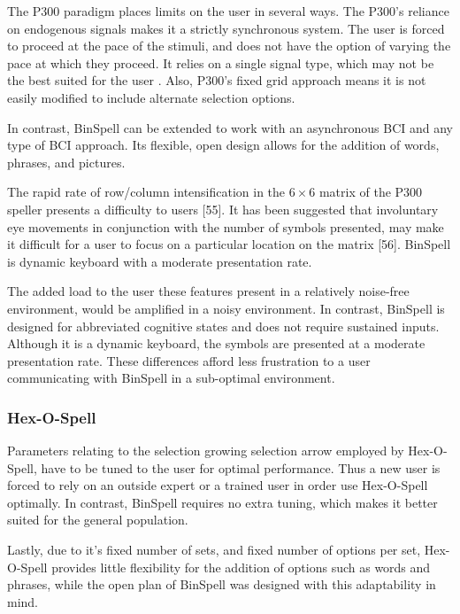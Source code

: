 \documentclass[12pt,titlepage]{article}
\begin{document}
The P300 paradigm places limits on the user in several ways.  The P300's reliance on 
endogenous signals makes it a strictly synchronous system.  The user is forced to proceed at the 
pace of the stimuli, and does not have the option of varying the pace at which they proceed.  It 
relies on a single signal type, which may not be the best suited for the user \cite{wolpaw_braincomputer_2002}.  Also, P300's 
fixed grid approach means it is not easily modified to include alternate selection options.

In contrast, BinSpell can be extended to work with an asynchronous BCI and any type of BCI 
approach.  Its flexible, open design allows for the addition of words, phrases, and pictures.

The rapid rate of row/column intensification in the $6\times6$ matrix of the P300 speller presents a 
difficulty to users [55].  It has been suggested that involuntary eye movements in conjunction with 
the number of symbols presented, may make it difficult for a user to focus on a particular 
location on the matrix [56].  BinSpell is dynamic keyboard with a moderate presentation rate. 

The added load to the user these features present in a relatively noise-free environment, would 
be amplified in a noisy environment.  In contrast, BinSpell is designed for abbreviated 
cognitive states and does not require sustained inputs.  Although it is a dynamic keyboard, the 
symbols are presented at a moderate presentation rate.  These differences afford less frustration 
to a user communicating with BinSpell in a sub-optimal environment.

\subsubsection{Hex-O-Spell}

Parameters relating to the selection growing selection arrow employed by Hex-O-Spell, have to be tuned to the 
user for optimal performance.  Thus a new user is forced to rely on an outside expert or a 
trained user in order use Hex-O-Spell optimally.  In contrast, BinSpell requires no extra tuning, 
which makes it better suited for the general population. 

Lastly, due to it's fixed number of sets, and fixed number of options per set, Hex-O-Spell 
provides little flexibility for the addition of options such as words and phrases, while the open 
plan of BinSpell was designed with this adaptability in mind.
\end{document}

